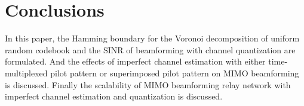 \documentclass[10pt,fleqn, twocolumn]{IEEEtran}
\begin{document}
\section{Conclusions}
In this paper, the Hamming boundary for the Voronoi decomposition
of uniform random codebook and the SINR of beamforming with
channel quantization are formulated. And the effects of imperfect
channel estimation with either time-multiplexed pilot pattern or
superimposed pilot pattern on MIMO beamforming is discussed.
Finally the scalability of MIMO beamforming relay network with
imperfect channel estimation and quantization is discussed.
\small


\end{document}
